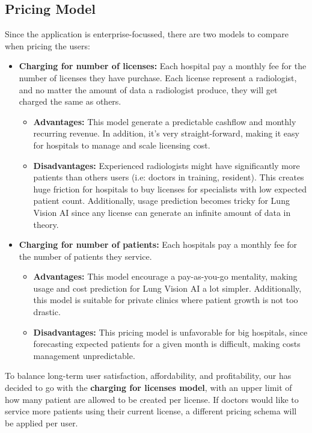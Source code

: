 \documentclass{article}
\begin{document}
\subsection{Pricing Model}
Since the application is enterprise-focussed, there are two models to compare when pricing the users:
\begin{itemize}
    \item \textbf{Charging for number of licenses:} Each hospital pay a monthly fee for the number of licenses they have purchase. Each license represent a radiologist, and no matter the amount of data a radiologist produce, they will get charged the same as others.
    \begin{itemize}
        \item \textbf{Advantages:} This model generate a predictable cashflow and monthly recurring revenue. In addition, it's very straight-forward, making it easy for hospitals to manage and scale licensing cost.
        \item \textbf{Disadvantages:} Experienced radiologists might have significantly more patients than others users (i.e: doctors in training, resident). This creates huge friction for hospitals to buy licenses for specialists with low expected patient count. Additionally, usage prediction becomes tricky for Lung Vision AI since any license can generate an infinite amount of data in theory.
    \end{itemize}
    
    \item \textbf{Charging for number of patients:} Each hospitals pay a monthly fee for the number of patients they service.
    \begin{itemize}
        \item \textbf{Advantages:} This model encourage a pay-as-you-go mentality, making usage and cost prediction for Lung Vision AI a lot simpler. Additionally, this model is suitable for private clinics where patient growth is not too drastic.
        \item \textbf{Disadvantages:} This pricing model is unfavorable for big hospitals, since forecasting expected patients for a given month is difficult, making costs management unpredictable.
    \end{itemize}
\end{itemize}

To balance long-term user satisfaction, affordability, and profitability, our has decided to go with the \textbf{charging for licenses model}, with an upper limit of how many patient are allowed to be created per license. If doctors would like to service more patients using their current license, a different pricing schema will be applied per user.
\end{document}
